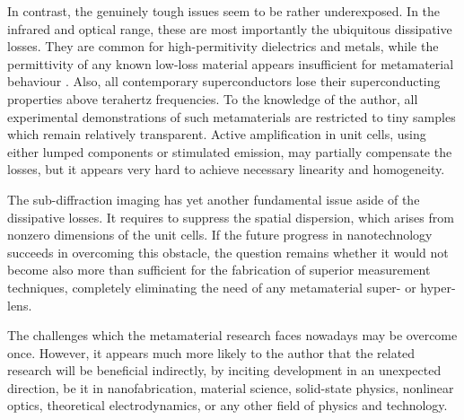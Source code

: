 In contrast, the genuinely tough issues seem to be rather underexposed. In the infrared and optical range, these are most importantly the ubiquitous dissipative losses. They are common for high-permitivity dielectrics and metals, while the permittivity of any known low-loss material appears insufficient for metamaterial behaviour \cite{dominec2014transition}. Also, all contemporary superconductors lose their superconducting properties above terahertz frequencies. To the knowledge of the author, all experimental demonstrations of such metamaterials are restricted to tiny samples which remain relatively transparent. Active amplification in unit cells, using either lumped components \cite{jelinek2011fet} or stimulated emission, may partially compensate the losses, but it appears very hard to achieve necessary linearity and homogeneity. 

The sub-diffraction imaging has yet another fundamental issue aside of the dissipative losses. It requires to suppress the spatial dispersion, which arises from nonzero dimensions of the unit cells. If the future progress in nanotechnology succeeds in overcoming this obstacle, the question remains whether it would not become also more than sufficient for the fabrication of superior measurement techniques, completely eliminating the need of any metamaterial super- or hyper-lens. 

The challenges which the metamaterial research faces nowadays may be overcome once. However, it appears much more likely to the author that the related research will be beneficial indirectly, by inciting development in an unexpected direction, be it in nanofabrication, material science, solid-state physics, nonlinear optics, theoretical electrodynamics, or any other field of physics and technology.

